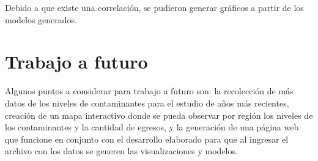 Debido a que existe una correlación, se pudieron generar gráficos a partir de los modelos generados.

\clearpage


\section{Trabajo a futuro}
Algunos puntos a considerar para trabajo a futuro son: la recolección de más datos de los niveles de contaminantes para el estudio de años más recientes, creación de un mapa interactivo donde se pueda observar por región los niveles de los contaminantes y la cantidad de egresos, y la generación de una página web que funcione en conjunto con el desarrollo elaborado para que al ingresar el archivo con los datos se generen las visualizaciones y modelos.
